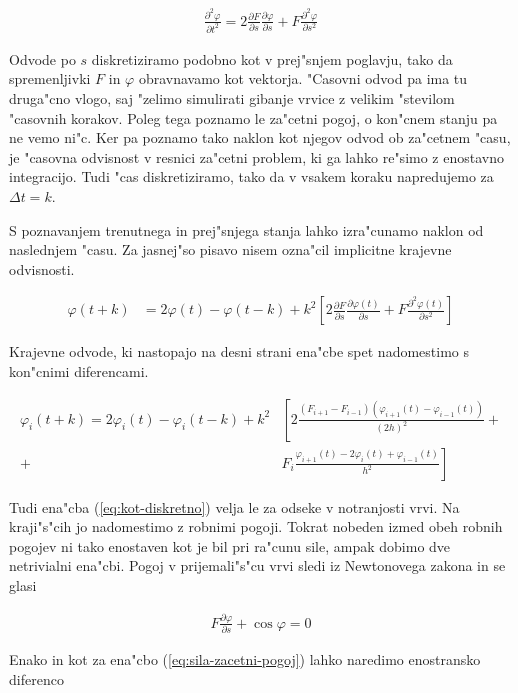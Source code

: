 \documentclass[a4paper,10pt]{article}
\renewcommand{\phi}{\varphi}
\newcommand{\parcialno}[2]{
  \frac{\partial #1}{\partial #2}
}
\newcommand{\parcdva}[2]{
  \frac{\partial^2 #1}{\partial #2 ^2}
}
\begin{document}
\begin{align}
 \label{eq:kot}
 \parcdva{\phi}{t} = 2\parcialno{F}{s}\parcialno{\phi}{s} + F\parcdva{\phi}{s}
\end{align}

Odvode po $s$ diskretiziramo podobno kot v prej"snjem poglavju, tako da spremenljivki $F$ in $\phi$ obravnavamo kot vektorja. "Casovni odvod pa ima tu druga"cno vlogo, saj "zelimo simulirati gibanje vrvice z velikim "stevilom "casovnih korakov. Poleg tega poznamo le za"cetni pogoj, o kon"cnem stanju pa ne vemo ni"c. Ker pa poznamo tako naklon kot njegov odvod ob za"cetnem "casu, je "casovna odvisnost v resnici za"cetni problem, ki ga lahko re"simo z enostavno integracijo. Tudi "cas diskretiziramo, tako da v vsakem koraku napredujemo za $\Delta t = k$. 

S poznavanjem trenutnega in prej"snjega stanja lahko izra"cunamo naklon od naslednjem "casu. Za jasnej"so pisavo nisem ozna"cil implicitne krajevne odvisnosti. 

\begin{align}
 \label{eq:kot-razvoj}
 \phi(t+k) &= 2\phi(t) - \phi(t-k) + k^2 \left[ 2\parcialno{F}{s}\parcialno{\phi(t)}{s} + F\parcdva{\phi(t)}{s} \right]
\end{align}

Krajevne odvode, ki nastopajo na desni strani ena"cbe spet nadomestimo s kon"cnimi diferencami. 

\begin{align}
 \phi_i(t+k) = 2\phi_i(t) - \phi_i(t-k) + k^2 &\left[2\frac{(F_{i+1}-F_{i-1})(\phi_{i+1}(t)-\phi_{i-1}(t))}{(2h)^2}\right. + \nonumber \\
+ & \left. F_i\frac{\phi_{i+1}(t) - 2\phi_i(t) + \phi_{i-1}(t)}{h^2}\right] \label{eq:kot-diskretno}
\end{align}

Tudi ena"cba (\ref{eq:kot-diskretno}) velja le za odseke v notranjosti vrvi. Na kraji"s"cih jo nadomestimo z robnimi pogoji. Tokrat nobeden izmed obeh robnih pogojev ni tako enostaven kot je bil pri ra"cunu sile, ampak dobimo dve netrivialni ena"cbi. Pogoj v prijemali"s"cu vrvi sledi iz Newtonovega zakona in se glasi

\begin{align}
 \label{eq:kot-zacetni-pogoj}
 F \parcialno{\phi}{s} + \cos \phi = 0
\end{align}

Enako in kot za ena"cbo (\ref{eq:sila-zacetni-pogoj}) lahko naredimo enostransko diferenco
\end{document}
